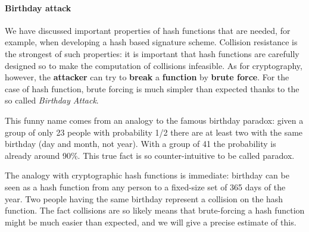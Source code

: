 

\paragraph{Birthday attack}
We have discussed important properties of hash functions that are needed, for example, when developing a hash based signature scheme. Collision resistance is the strongest of such properties: it is important that hash functions are carefully designed so to make the computation of collisions infeasible. As for cryptography, however, the \textbf{attacker} can try to \textbf{break} a \textbf{function} by \textbf{brute force}. For the case of hash function, brute forcing is much simpler than expected thanks to the so called \textit{Birthday Attack}.

This funny name comes from an analogy to the famous birthday paradox: given a group of only 23 people with probability 1/2 there are at least two with the same birthday (day and month, not year). With a group of 41 the probability is already around 90\%. This true fact is so counter-intuitive to be called paradox.

The analogy with cryptographic hash functions is immediate: birthday can be seen as a hash function from any person to a fixed-size set of 365 days of the year. Two people having the same birthday represent a collision on the hash function. The fact collisions are so likely means that brute-forcing a hash function might be much easier than expected, and we will give a precise estimate of this.

